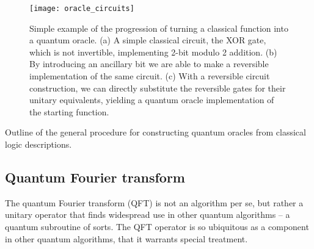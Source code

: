 \begin{figure}[!htbp]
\texttt{[image: oracle\_circuits]}
\caption{Simple example of the progression of turning a classical function into a quantum oracle. (a) A simple classical circuit, the XOR gate, which is not invertible, implementing 2-bit modulo 2 addition. (b) By introducing an ancillary bit we are able to make a reversible implementation of the same circuit. (c) With a reversible circuit construction, we can directly substitute the reversible gates for their unitary equivalents, yielding a quantum oracle implementation of the starting function.}\label{fig:oracle_circ}	
\end{figure}

\begin{table}[!htbp]
\captionspacealg \caption{Outline of the general procedure for constructing quantum oracles from classical logic descriptions.} \label{alg:oracle_const}
\end{table}

%
%

\subsection{Quantum Fourier transform}\label{sec:QFT_alg}

The quantum Fourier transform (QFT) is not an algorithm per se, but rather a unitary operator that finds widespread use in other quantum algorithms -- a quantum subroutine of sorts. The QFT operator is so ubiquitous as a component in other quantum algorithms, that it warrants special treatment.

